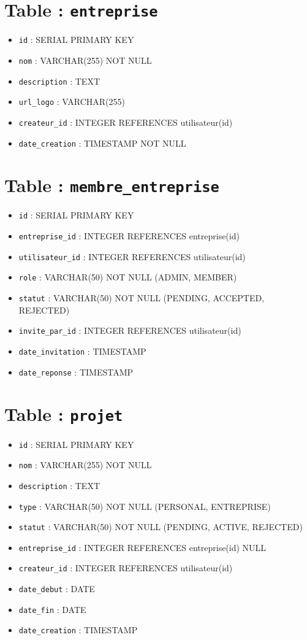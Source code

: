 \documentclass[12pt,a4paper]{report}
\begin{document}
\section*{Table : \texttt{entreprise}}
\begin{itemize}
\item \verb|id| : SERIAL PRIMARY KEY
\item \verb|nom| : VARCHAR(255) NOT NULL
\item \verb|description| : TEXT
\item \verb|url_logo| : VARCHAR(255)
\item \verb|createur_id| : INTEGER REFERENCES utilisateur(id)
\item \verb|date_creation| : TIMESTAMP NOT NULL
\end{itemize}

\section*{Table : \texttt{membre\_entreprise}}
\begin{itemize}
\item \verb|id| : SERIAL PRIMARY KEY
\item \verb|entreprise_id| : INTEGER REFERENCES entreprise(id)
\item \verb|utilisateur_id| : INTEGER REFERENCES utilisateur(id)
\item \verb|role| : VARCHAR(50) NOT NULL (ADMIN, MEMBER)
\item \verb|statut| : VARCHAR(50) NOT NULL (PENDING, ACCEPTED, REJECTED)
\item \verb|invite_par_id| : INTEGER REFERENCES utilisateur(id)
\item \verb|date_invitation| : TIMESTAMP
\item \verb|date_reponse| : TIMESTAMP
\end{itemize}

\section*{Table : \texttt{projet}}
\begin{itemize}
\item \verb|id| : SERIAL PRIMARY KEY
\item \verb|nom| : VARCHAR(255) NOT NULL
\item \verb|description| : TEXT
\item \verb|type| : VARCHAR(50) NOT NULL (PERSONAL, ENTREPRISE)
\item \verb|statut| : VARCHAR(50) NOT NULL (PENDING, ACTIVE, REJECTED)
\item \verb|entreprise_id| : INTEGER REFERENCES entreprise(id) NULL
\item \verb|createur_id| : INTEGER REFERENCES utilisateur(id)
\item \verb|date_debut| : DATE
\item \verb|date_fin| : DATE
\item \verb|date_creation| : TIMESTAMP
\end{itemize}
\end{document}
